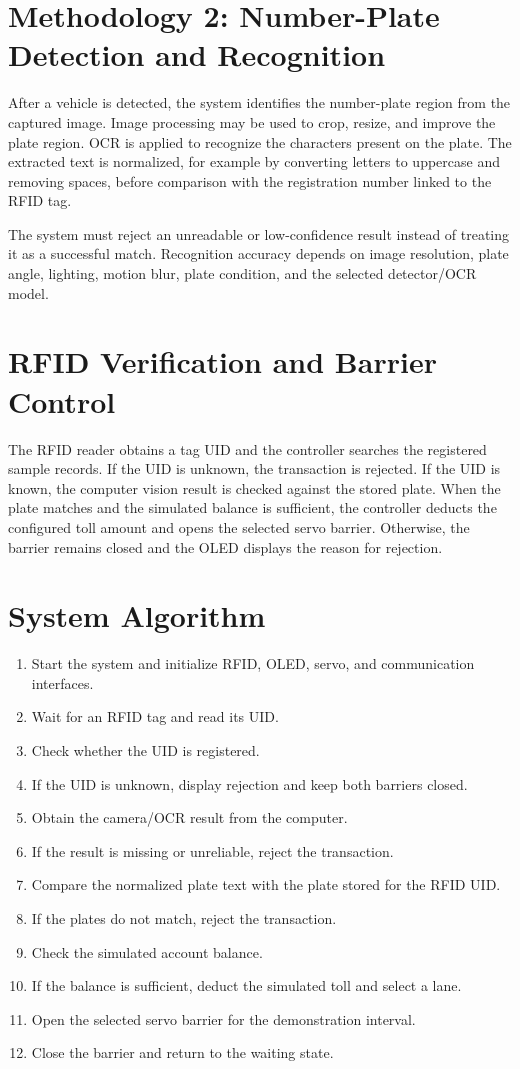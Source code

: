\documentclass[12pt,a4paper]{report}
\begin{document}
\section{Methodology 2: Number-Plate Detection and Recognition}
After a vehicle is detected, the system identifies the number-plate region from the
captured image. Image processing may be used to crop, resize, and improve the plate
region. OCR is applied to recognize the characters present on the plate. The extracted
text is normalized, for example by converting letters to uppercase and removing spaces,
before comparison with the registration number linked to the RFID tag.

The system must reject an unreadable or low-confidence result instead of treating it
as a successful match. Recognition accuracy depends on image resolution, plate angle,
lighting, motion blur, plate condition, and the selected detector/OCR model.

\section{RFID Verification and Barrier Control}
The RFID reader obtains a tag UID and the controller searches the registered sample
records. If the UID is unknown, the transaction is rejected. If the UID is known, the
computer vision result is checked against the stored plate. When the plate matches and
the simulated balance is sufficient, the controller deducts the configured toll amount
and opens the selected servo barrier. Otherwise, the barrier remains closed and the
OLED displays the reason for rejection.

\section{System Algorithm}
\begin{enumerate}
\item Start the system and initialize RFID, OLED, servo, and communication interfaces.
\item Wait for an RFID tag and read its UID.
\item Check whether the UID is registered.
\item If the UID is unknown, display rejection and keep both barriers closed.
\item Obtain the camera/OCR result from the computer.
\item If the result is missing or unreliable, reject the transaction.
\item Compare the normalized plate text with the plate stored for the RFID UID.
\item If the plates do not match, reject the transaction.
\item Check the simulated account balance.
\item If the balance is sufficient, deduct the simulated toll and select a lane.
\item Open the selected servo barrier for the demonstration interval.
\item Close the barrier and return to the waiting state.
\end{enumerate}
\end{document}
